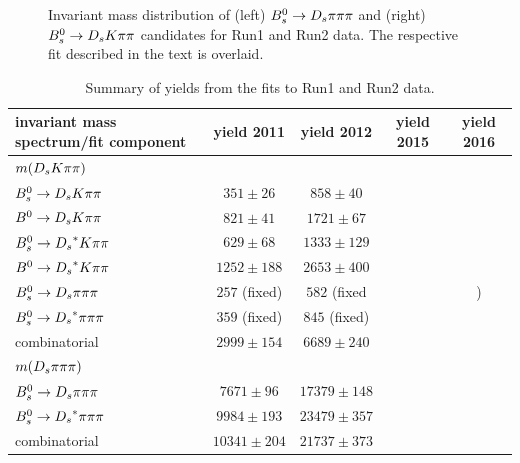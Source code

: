 \begin{figure}[h]
\caption{Invariant mass distribution of (left) ${{B}^0_{s}}\rightarrow{\ensuremath{{D}_{s}}}{\ensuremath{\pi}}{\ensuremath{\pi}}{\ensuremath{\pi}}$ and (right) ${{B}^0_{s}}\rightarrow{\ensuremath{{D}_{s}}}{\ensuremath{K}}{\ensuremath{\pi}}{\ensuremath{\pi}}$ candidates for Run1 and Run2 data.
The respective fit described in the text is overlaid.} %
\label{fig: BsDsKpipiFit}
\end{figure}


\begin{table}[h]
\centering
\begin{tabular}{l c c c c}
invariant mass spectrum/fit component & yield 2011 & yield 2012  & yield 2015  & yield 2016\\
\hline \hline
$m({{D}_{s}}{K}{\pi}{\pi})$    &                  &       &           &\\
\hline
${{B}^0_{s}}\rightarrow{\ensuremath{{D}_{s}}}{\ensuremath{K}}{\ensuremath{\pi}}{\ensuremath{\pi}}$    &  $351 \pm 26$    &  $858 \pm 40$ & &\\
${{B}^0}\rightarrow{\ensuremath{{D}_{s}}}{\ensuremath{K}}{\ensuremath{\pi}}{\ensuremath{\pi}}$    &  $821 \pm 41$    &  $1721 \pm 67$ & &\\
${{B}^0_{s}}\rightarrow{\ensuremath{{D}_{s}}}^{*}{K}{\pi}{\pi}$ &  $629 \pm 68$   &  $1333 \pm 129$ & &\\
${{B}^0}\rightarrow{\ensuremath{{D}_{s}}}^{*}{K}{\pi}{\pi}$ &  $1252 \pm 188$ &  $2653 \pm 400$ & &\\
${{B}^0_{s}}\rightarrow{\ensuremath{{D}_{s}}}{\ensuremath{\pi}}{\ensuremath{\pi}}{\ensuremath{\pi}}$    &  $257$ (fixed)   & $582$ (fixed & &)\\
${{B}^0_{s}}\rightarrow{\ensuremath{{D}_{s}}}^{*}{\pi}{\pi}{\pi}$ &  $359$ (fixed)  & $845$ (fixed) & &\\
combinatorial                 &  $2999 \pm 154$  & $6689 \pm 240$ & &\\
\hline \hline
$m({{D}_{s}}{\pi}{\pi}{\pi})$       &                  &    &           & \\
\hline
${{B}^0_{s}}\rightarrow{\ensuremath{{D}_{s}}}{\ensuremath{\pi}}{\ensuremath{\pi}}{\ensuremath{\pi}}$    &  $7671 \pm 96$  &  $17379 \pm 148$ & &\\
${{B}^0_{s}}\rightarrow{\ensuremath{{D}_{s}}}^{*}{\pi}{\pi}{\pi}$ & $9984 \pm 193$  & $23479 \pm 357$ & &\\
combinatorial                 & $10341 \pm 204$  & $21737 \pm 373$ & &\\
\hline
\end{tabular}
\caption{Summary of yields from the fits to Run1 and Run2 data.}
\label{tab: SigYields}
\end{table}



